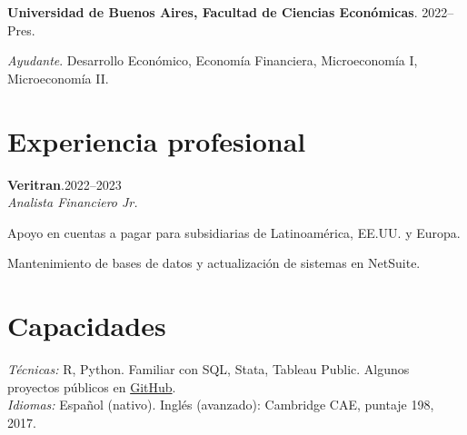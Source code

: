 \documentclass[11pt]{article}
\newcommand{\entrydate}[1]{\hfill{\small{#1}}}
\begin{document}
\textbf{Universidad de Buenos Aires, Facultad de Ciencias Económicas}. \entrydate{2022--Pres.}
\begin{cvitems}
  \item \textit{Ayudante}. Desarrollo Económico, Economía Financiera, Microeconomía I, Microeconomía II.
\end{cvitems}

\section{Experiencia profesional}
\textbf{Veritran}.\entrydate{2022--2023}\\
\textit{Analista Financiero Jr.}
\begin{cvitems}
  \item Apoyo en cuentas a pagar para subsidiarias de Latinoamérica, EE.UU. y Europa.
  \item Mantenimiento de bases de datos y actualización de sistemas en NetSuite.
\end{cvitems}

\section{Capacidades}
\textit{Técnicas:} R, Python. Familiar con SQL, Stata, Tableau Public. Algunos proyectos públicos en \href{https://www.github.com/sanarovaz/}{GitHub}.\\
\textit{Idiomas:} Español (nativo). Inglés (avanzado): Cambridge CAE, puntaje 198, 2017.

\end{document}
